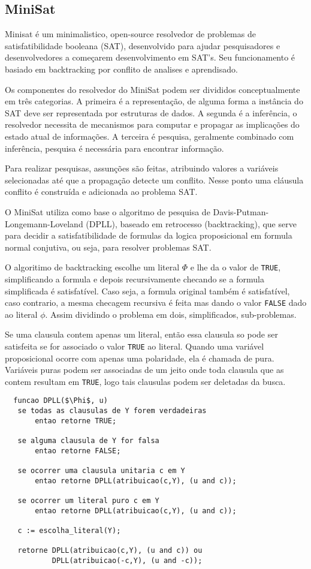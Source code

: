 \subsection{MiniSat}
\label{sec:minisat}

Minisat é um minimalistico, open-source resolvedor de problemas de satisfatibilidade booleana (SAT), desenvolvido para 
ajudar pesquisadores e desenvolvedores a começarem desenvolvimento em SAT's. Seu funcionamento é basiado em backtracking
por conflito de analises e aprendisado.

Os componentes do resolvedor do MiniSat podem ser divididos conceptualmente em três categorias. A primeira é a representação,
de alguma forma a instância do SAT deve ser representada por estruturas de dados. A segunda é a inferência, o resolvedor necessita
de mecanismos para computar e propagar as implicações do estado atual de informações. A terceira é pesquisa, geralmente combinado
com inferência, pesquisa é necessária para encontrar informação.

Para realizar pesquisas, assunções são feitas, atribuindo valores a variáveis selecionadas até que a propagação detecte um conflito.
Nesse ponto uma cláusula conflito é construída e adicionada ao problema SAT.

O MiniSat utiliza como base o algoritmo de pesquisa de Davis-Putman-Longemann-Loveland (DPLL), baseado em 
retrocesso (backtracking), que serve para decidir a satisfatibilidade de formulas da logica proposicional em formula normal
conjutiva, ou seja, para resolver problemas SAT.

O algoritimo de backtracking escolhe um literal $\Phi$ e lhe da o valor de \texttt{TRUE}, simplificando a formula e depois
recursivamente checando se a formula simplificada é satisfatível. Caso seja, a formula original também é
satisfatível, caso contrario, a mesma checagem recursiva é feita mas dando o valor \texttt{FALSE} dado ao literal $\phi$.
Assim dividindo o problema em dois, simplificados, sub-problemas.

Se uma clausula contem apenas um literal, então essa clausula so pode ser satisfeita se for associado o valor
\texttt{TRUE} ao literal. Quando uma variável proposicional ocorre com apenas uma polaridade, ela é chamada de pura. Variáveis puras
podem ser associadas de um jeito onde toda clausula que as contem resultam em \texttt{TRUE}, logo tais clausulas podem
ser deletadas da busca.
\begin{lstlisting}
  funcao DPLL($\Phi$, u)
   se todas as clausulas de Y forem verdadeiras 
       entao retorne TRUE;
       
   se alguma clausula de Y for falsa
       entao retorne FALSE;
       
   se ocorrer uma clausula unitaria c em Y
       entao retorne DPLL(atribuicao(c,Y), (u and c));
       
   se ocorrer um literal puro c em Y
       entao retorne DPLL(atribuicao(c,Y), (u and c));
       
   c := escolha_literal(Y);
   
   retorne DPLL(atribuicao(c,Y), (u and c)) ou
           DPLL(atribuicao(-c,Y), (u and -c));
\end{lstlisting}


